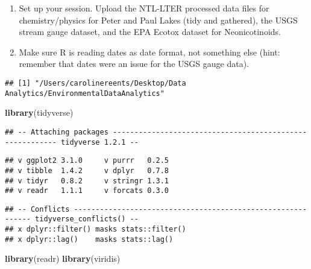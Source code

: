 \documentclass[]{article}
\newenvironment{Shaded}{\begin{snugshade}}{\end{snugshade}}
\newcommand{\KeywordTok}[1]{\textcolor[rgb]{0.13,0.29,0.53}{\textbf{#1}}}
\newcommand{\CommentTok}[1]{\textcolor[rgb]{0.56,0.35,0.01}{\textit{#1}}}
\newcommand{\NormalTok}[1]{#1}
\begin{document}
\begin{enumerate}
\def\labelenumi{\arabic{enumi}.}
\item
  Set up your session. Upload the NTL-LTER processed data files for
  chemistry/physics for Peter and Paul Lakes (tidy and gathered), the
  USGS stream gauge dataset, and the EPA Ecotox dataset for
  Neonicotinoids.
\item
  Make sure R is reading dates as date format, not something else (hint:
  remember that dates were an issue for the USGS gauge data).
\end{enumerate}

\begin{Shaded}
\end{Shaded}

\begin{verbatim}
## [1] "/Users/carolinereents/Desktop/Data Analytics/EnvironmentalDataAnalytics"
\end{verbatim}

\begin{Shaded}
\begin{Highlighting}[]
\KeywordTok{library}\NormalTok{(tidyverse)}
\end{Highlighting}
\end{Shaded}

\begin{verbatim}
## -- Attaching packages --------------------------------------------------------- tidyverse 1.2.1 --
\end{verbatim}

\begin{verbatim}
## v ggplot2 3.1.0     v purrr   0.2.5
## v tibble  1.4.2     v dplyr   0.7.8
## v tidyr   0.8.2     v stringr 1.3.1
## v readr   1.1.1     v forcats 0.3.0
\end{verbatim}

\begin{verbatim}
## -- Conflicts ------------------------------------------------------------ tidyverse_conflicts() --
## x dplyr::filter() masks stats::filter()
## x dplyr::lag()    masks stats::lag()
\end{verbatim}

\begin{Shaded}
\begin{Highlighting}[]
\KeywordTok{library}\NormalTok{(readr)}
\KeywordTok{library}\NormalTok{(viridis)}
\end{Highlighting}
\end{Shaded}
\end{document}

